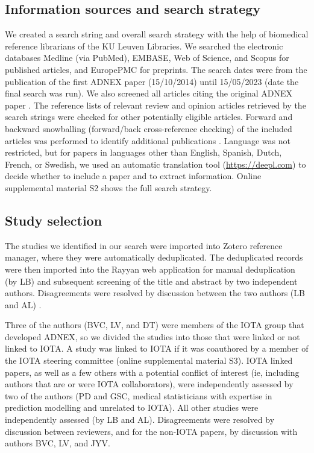 \subsection{Information sources and search strategy}
We created a search string and overall search strategy with the help of
biomedical reference librarians of the KU Leuven Libraries. We searched the
electronic databases Medline (via PubMed), EMBASE, Web of Science, and Scopus
for published articles, and EuropePMC for preprints. The search dates were from
the publication of the first \gls{ADNEX} paper (15/10/2014) until 15/05/2023 (date the
final search was run). We also screened all articles citing the original \gls{ADNEX}
paper \cite{vancalsterEvaluatingRiskOvarian2014}. The reference lists of
relevant review and opinion articles retrieved by the search strings were
checked for other potentially eligible articles. Forward and backward
snowballing (forward/back cross-reference checking) of the included articles was
performed to identify additional publications \cite{wohlinGuidelinesSnowballingSystematic2014}. Language was not restricted, but for papers in languages other than English, Spanish, Dutch, French, or Swedish, we used an automatic translation tool (\url{https://deepl.com}) to decide whether to include a paper and to extract information. Online supplemental material S2 shows the full search strategy.

\subsection{Study selection}
The studies we identified in our search were imported into Zotero reference manager, where they were automatically deduplicated. The deduplicated records were then imported into the Rayyan web application for manual deduplication (by LB) and subsequent screening of the title and abstract by two independent authors. Disagreements were resolved by discussion between the two authors (LB and AL) \cite{ouzzaniRayyanWebMobile2016}.

Three of the authors (BVC, LV, and DT) were members of the IOTA group that developed ADNEX, so we divided the studies into those that were linked or not linked to IOTA. A study was linked to IOTA if it was coauthored by a member of the IOTA steering committee (online supplemental material S3). IOTA linked papers, as well as a few others with a potential conflict of interest (ie, including authors that are or were IOTA collaborators), were independently assessed by two of the authors (PD and GSC, medical statisticians with expertise in prediction modelling and unrelated to IOTA). All other studies were independently assessed (by LB and AL). Disagreements were resolved by discussion between reviewers, and for the non-IOTA papers, by discussion with authors BVC, LV, and JYV.

